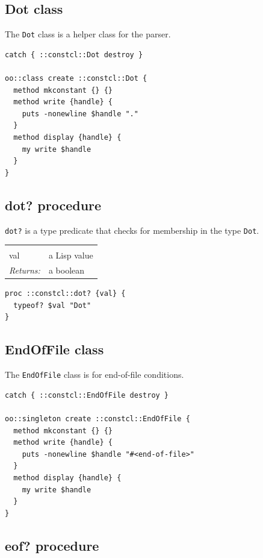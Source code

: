 \documentclass[twoside,9pt]{report}
\begin{document}
\subsection{Dot class}
\label{dot-class}


The \texttt{Dot} class is a helper class for the parser.

\begin{lstlisting}
catch { ::constcl::Dot destroy }

oo::class create ::constcl::Dot {
  method mkconstant {} {}
  method write {handle} {
    puts -nonewline $handle "."
  }
  method display {handle} {
    my write $handle
  }
}
\end{lstlisting}
\subsection{dot? procedure}
\label{dot?-procedure}


\texttt{dot?} is a type predicate that checks for membership in the type \texttt{Dot}.

\noindent\begin{tabular}{ |p{1.9cm} p{8cm}| }
\hline
\rowcolor[HTML]{CCCCCC} \multicolumn{2}{|l|}{\bf dot? (internal)} \\
val & a Lisp value \\
\textit{Returns:} & a boolean \\
\hline
\end{tabular}
\begin{lstlisting}
proc ::constcl::dot? {val} {
  typeof? $val "Dot"
}
\end{lstlisting}
\subsection{EndOfFile class}
\label{endoffile-class}


The \texttt{EndOfFile} class is for end-of-file conditions.

\begin{lstlisting}
catch { ::constcl::EndOfFile destroy }

oo::singleton create ::constcl::EndOfFile {
  method mkconstant {} {}
  method write {handle} {
    puts -nonewline $handle "#<end-of-file>"
  }
  method display {handle} {
    my write $handle
  }
}
\end{lstlisting}
\subsection{eof? procedure}
\label{eof?-procedure}
\end{document}

